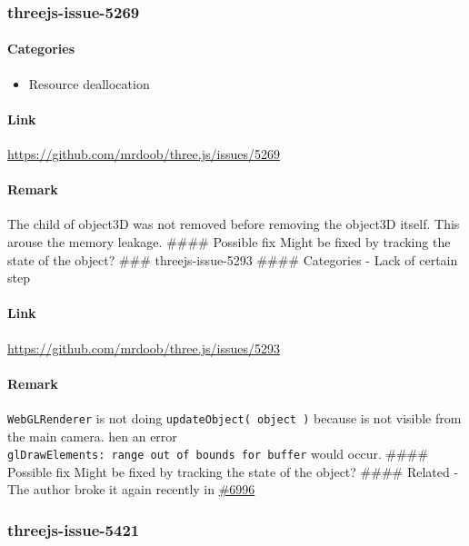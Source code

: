 \subsubsection{threejs-issue-5269}\label{threejs-issue-5269}

\paragraph{Categories}\label{categories-1}

\begin{itemize}
\tightlist
\item
  Resource deallocation
\end{itemize}

\paragraph{Link}\label{link-6}

\url{https://github.com/mrdoob/three.js/issues/5269}

\paragraph{Remark}\label{remark-6}

The child of object3D was not removed before removing the object3D
itself. This arouse the memory leakage. \#\#\#\# Possible fix Might be
fixed by tracking the state of the object? \#\#\# threejs-issue-5293
\#\#\#\# Categories - Lack of certain step

\paragraph{Link}\label{link-7}

\url{https://github.com/mrdoob/three.js/issues/5293}

\paragraph{Remark}\label{remark-7}

\texttt{WebGLRenderer} is not doing \texttt{updateObject(\ object\ )}
because is not visible from the main camera. hen an error
\texttt{glDrawElements:\ range\ out\ of\ bounds\ for\ buffer} would
occur. \#\#\#\# Possible fix Might be fixed by tracking the state of the
object? \#\#\#\# Related - The author broke it again recently in
\href{https://github.com/mrdoob/three.js/issues/6996}{\#6996}

\subsubsection{threejs-issue-5421}\label{threejs-issue-5421}

